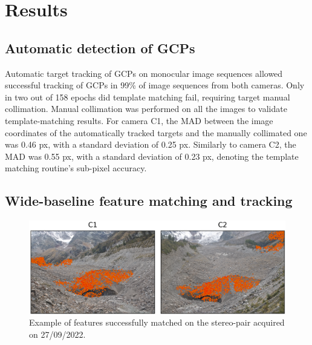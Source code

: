 \section{Results}\label{sec:4:results}

\subsection{Automatic detection of GCPs}\label{sec:4:res_gcptracking}

Automatic target tracking of GCPs on monocular image sequences allowed successful tracking of GCPs
in 99\% of image sequences from both cameras. 
Only in two out of 158 epochs did template matching fail, requiring target manual collimation.
Manual collimation was performed on all the images to validate template-matching results.
For camera C1, the MAD between the image coordinates of the automatically tracked targets and the manually collimated one was 0.46 px, with a standard deviation of 0.25 px. 
Similarly to camera C2, the MAD was 0.55 px, with a standard deviation of 0.23 px, denoting the template matching routine's sub-pixel accuracy.

\subsection{Wide-baseline feature matching and tracking}\label{sec:4:res_matching}

\begin{figure}
  \includegraphics[width=1.0\linewidth]{4_matches_2022_09_27.png}
  \caption{Example of features successfully matched on the stereo-pair acquired on
    27/09/2022.}
  \label{fig:4:matches}
\end{figure}

